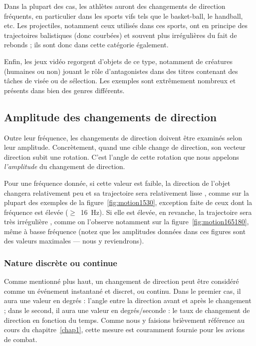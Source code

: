 	Dans la plupart des cas, les athlètes auront des changements de direction fréquents, en particulier dans les sports \og vifs \fg{} tels que le basket-ball, le handball, etc.	Les projectiles, notamment ceux utilisés dans ces sports, ont en principe des trajectoires balistiques (donc courbées) et souvent plus irrégulières du fait de rebonds ; ils sont donc dans cette catégorie également.
	
	Enfin, les jeux vidéo regorgent d'objets de ce type, notamment de créatures (humaines ou non) jouant le rôle d'antagonistes dans des titres contenant des tâches de visée ou de sélection. Les exemples sont extrêmement nombreux et présents dans bien des genres différents.
	
	\subsection{Amplitude des changements de direction}
	Outre leur fréquence, les changements de direction doivent être examinés selon leur amplitude. Concrètement, quand une cible change de direction, son vecteur direction subit une rotation. C'est l'angle de cette rotation que nous appelons \emph{l'amplitude} du changement de direction.
	
	Pour une fréquence donnée, si cette valeur est faible, la direction de l'objet changera relativement peu et sa trajectoire sera relativement \og lisse \fg{}, comme sur la plupart des exemples de la figure~\ref{fig:motion1530}, exception faite de ceux dont la fréquence est élevée ($\geq$~16~Hz). Si elle est élevée, en revanche, la trajectoire sera très \og irrégulière \fg{}, comme on l'observe notamment sur la figure~\ref{fig:motion165180}, même à basse fréquence (notez que les amplitudes données dans ces figures sont des valeurs maximales --- nous y reviendrons).
	
	\subsubsection{Nature discrète ou continue}
	Comme mentionné plus haut, un changement de direction peut être considéré comme un événement instantané et discret, ou continu. Dans le premier cas, il aura une valeur en degrés : l'angle entre la direction avant et après le changement ; dans le second, il aura une valeur en degrés/seconde : le taux de changement de direction en fonction du temps. Comme nous y faisions brièvement référence au cours du chapitre~\ref{chap1}, cette mesure est couramment fournie pour les avions de combat.
	
